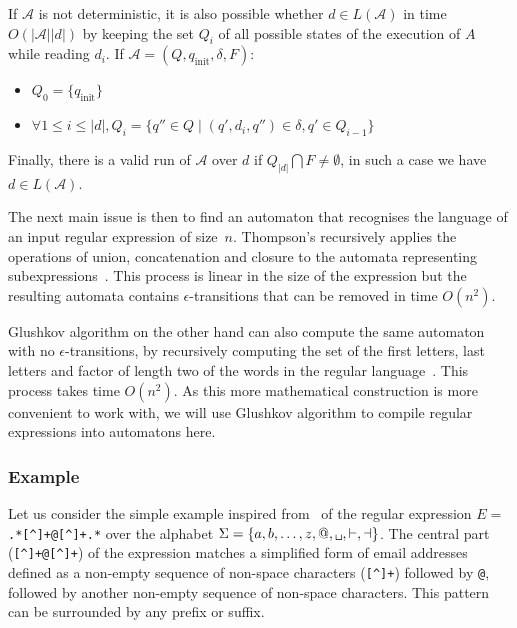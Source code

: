 \documentclass[12px]{article}
\theoremstyle{definition}
\begin{document}
        If $\mathcal{A}$ is not deterministic, it is also possible whether $d
        \in L(\mathcal{A})$ in time $O(|\mathcal{A}| |d|)$ by keeping the set
        $Q_i$ of all possible states of the execution of $A$ while reading
        $d_i$. If $\mathcal{A} = (Q, q_\text{init}, \delta, F)$:
        \begin{itemize}
          \item $Q_0 = \{q_\text{init}\}$
          \item $\forall 1 \leq i \leq |d|, Q_i = \{q'' \in Q \mid (q', d_i,
            q'') \in \delta,
            q' \in Q_{i-1}\}$
        \end{itemize}
        Finally, there is a valid run of $\mathcal{A}$ over $d$ if $Q_{|d|}
        \bigcap F \neq \emptyset$, in such a case we have $d \in
        L(\mathcal{A})$.

        \vspace{0.5cm}

        The next main issue is then to find an automaton that recognises the
        language of an input regular expression of size~$n$. Thompson's
        recursively applies the operations of union, concatenation and closure
        to the automata representing
        subexpressions~\cite{thompson1968programming}. This process is linear
        in the size of the expression but the resulting automata contains
        $\epsilon$-transitions that can be removed in time $O(n^2)$.

        Glushkov algorithm on the other hand can also compute the same
        automaton with no $\epsilon$-transitions, by recursively computing the
        set of the first letters, last letters and factor of length two of the
        words in the regular language~\cite{glushkov1961abstract}. This process
        takes time $O(n^2)$. As this more mathematical construction is more
        convenient to work with, we will use Glushkov algorithm to compile
        regular expressions into automatons here.

      \subsubsection{Example}%
        \label{sec:example_simple}

        Let us consider the simple example inspired from~\cite{ICDT19} of the
        regular expression $E =$
        \texttt{.*[\textasciicircum\textvisiblespace]+@[\textasciicircum\textvisiblespace]+.*}
        over the alphabet $\Sigma = \{a, b, \ldots, z, @, \texttt
        \textvisiblespace, \vdash, \dashv\}$.  The central part
        (\texttt{[\textasciicircum\textvisiblespace]+@[\textasciicircum\textvisiblespace]+})
        of the expression matches a simplified form of email addresses defined
        as a non-empty sequence of non-space characters
        (\texttt{[\textasciicircum\textvisiblespace]+}) followed by \texttt{@},
        followed by another non-empty sequence of non-space characters. This
        pattern can be surrounded by any prefix or suffix.
\end{document}
